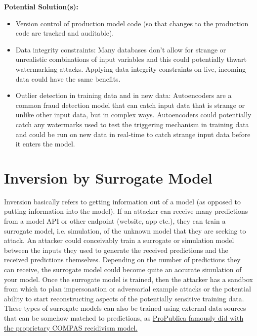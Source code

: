 \documentclass[fleqn]{article}
\begin{document}
\noindent\textbf{Potential Solution(s):}
\begin{itemize}
\item Version control of production model code (so that changes to the production code are tracked and auditable).
\item Data integrity constraints: Many databases don't  allow for strange or unrealistic combinations of input variables and this could potentially thwart watermarking attacks. Applying data integrity constraints on live, incoming data could have the same benefits.
\item Outlier detection in training data and in new data: Autoencoders are a common fraud detection model that can catch input data that is strange or unlike other input data, but in complex ways. Autoencoders could potentially catch any watermarks used to test the triggering mechanism in training data and could be run on new data in real-time to catch strange input data before it enters the model.
\end{itemize}

\section{Inversion by Surrogate Model}

Inversion basically refers to getting information out of a model (as opposed to putting information into the model). If an attacker can receive many predictions from a model API or other endpoint (website, app etc.), they can train a surrogate model, i.e. simulation, of the unknown model that they are seeking to attack. An attacker could conceivably train a surrogate or simulation model between the inputs they used to generate the received predictions and the received predictions themselves.  Depending on the number of predictions they can receive, the surrogate model could become quite an accurate simulation of your model. Once the surrogate model is trained, then the attacker has a sandbox from which to plan impersonation or adversarial example attacks or the potential ability to start reconstructing aspects of the potentially sensitive training data. These types of surrogate models can also be trained using external data sources that can be somehow matched to predictions, as \href{https://www.propublica.org/article/machine-bias-risk-assessments-in-criminal-sentencing}{ProPublica famously did with the proprietary COMPAS recidivism model.}\\
\end{document}

